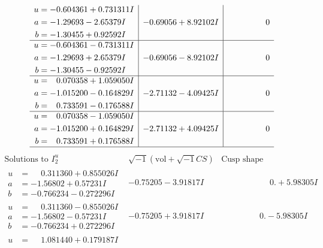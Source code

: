 \documentclass[1p]{elsarticle_modified}
\theoremstyle{definition}
\newcommand{\I}{\sqrt{-1}}
\begin{document}
$$\begin{array}{c|c|c}
\begin{aligned}
u &= -0.604361 + 0.731311 I \\
a &= -1.29693 - 2.65379 I \\
b &= -1.30455 + 0.92592 I\end{aligned}
 & -0.69056 + 8.92102 I & \phantom{-0.000000 } 0 \\ \hline\begin{aligned}
u &= -0.604361 - 0.731311 I \\
a &= -1.29693 + 2.65379 I \\
b &= -1.30455 - 0.92592 I\end{aligned}
 & -0.69056 - 8.92102 I & \phantom{-0.000000 } 0 \\ \hline\begin{aligned}
u &= \phantom{-}0.070358 + 1.059050 I \\
a &= -1.015200 - 0.164829 I \\
b &= \phantom{-}0.733591 - 0.176588 I\end{aligned}
 & -2.71132 - 4.09425 I & \phantom{-0.000000 } 0 \\ \hline\begin{aligned}
u &= \phantom{-}0.070358 - 1.059050 I \\
a &= -1.015200 + 0.164829 I \\
b &= \phantom{-}0.733591 + 0.176588 I\end{aligned}
 & -2.71132 + 4.09425 I & \phantom{-0.000000 } 0\\
 \hline 
 \end{array}$$\newpage$$\begin{array}{c|c|c}  
\text{Solutions to }I^u_{2}& \I (\text{vol} + \sqrt{-1}CS) & \text{Cusp shape}\\
 \hline 
\begin{aligned}
u &= \phantom{-}0.311360 + 0.855026 I \\
a &= -1.56802 + 0.57231 I \\
b &= -0.766234 - 0.272296 I\end{aligned}
 & -0.75205 - 3.91817 I & \phantom{-0.000000 -}0. + 5.98305 I \\ \hline\begin{aligned}
u &= \phantom{-}0.311360 - 0.855026 I \\
a &= -1.56802 - 0.57231 I \\
b &= -0.766234 + 0.272296 I\end{aligned}
 & -0.75205 + 3.91817 I & \phantom{-0.000000 } 0. - 5.98305 I \\ \hline\begin{aligned}
u &= \phantom{-}1.081440 + 0.179187 I \\

\end{aligned}
\end{array}$$
\end{document}
